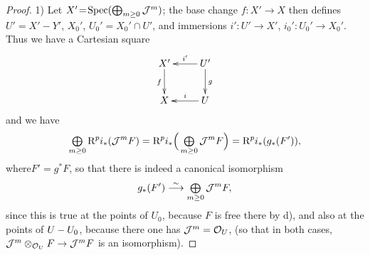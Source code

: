 \begin{proof}
1) Let $X'\!=\!\Spec(\sisi{\coprod}{\bigoplus}_{m\geq 0}\Jj^m)$; the base change \hbox{$f:X'\!\to\! X$} then defines $U'=X'- Y'$, $X_0'$, $U_0'=X_0'\cap U'$, and immersions $i':U'\to X'$, \hbox{$i_0':U_0'\to X_0'$}. Thus we have a Cartesian square
\[
\xymatrix{
X'\ar[d]_f&\ar[l]_-{i'} U'\ar[d]^g \\
X&\ar[l]_-{i} U
}
\]
and we have
\steco
\begin{equation} \label{eq:XII.19}
\sisi{\coprod}{\tbigoplus}_{m\geq 0}\R^pi_\ast(\Jj^mF) = \R^pi_\ast \Big(\sisi{\coprod}{\tbigoplus}_{m\geq 0} \Jj^mF \Big) =\R^pi_\ast (g_\ast(F')),
\end{equation}
where\pageoriginale $F'=g^\ast F$, so that there is indeed a canonical isomorphism
\[
g_\ast(F') \isomto \sisi{\coprod}{\tbigoplus}_{m\geq 0}\Jj^mF,
\]
since this is true at the points of $U_0$, because $F$ is free there by d), and also at the points of $\sisi{U_0}{U-U_0}$, because there one has $\Jj^m=\Oo_U$, (so that in both cases, $\Jj^m\otimes_{\Oo_U}F\to \Jj^mF$ is an isomorphism).


\end{proof}
